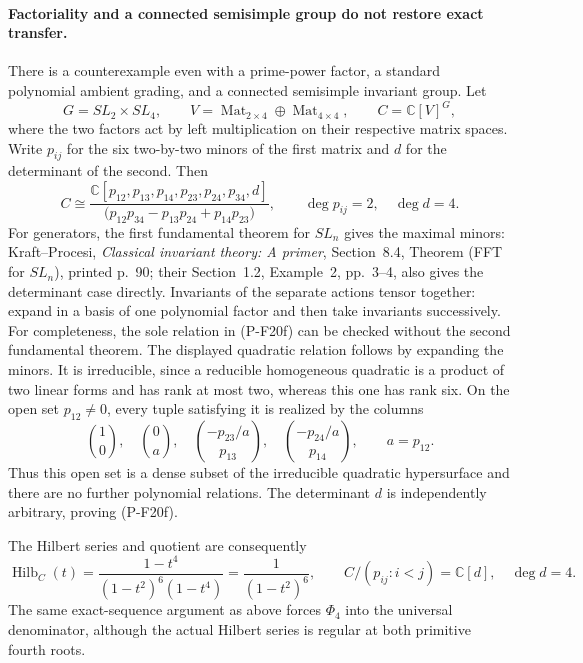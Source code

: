 \paragraph{Factoriality and a connected semisimple group do not restore exact transfer.}
There is a counterexample even with a prime-power factor, a standard
polynomial ambient grading, and a connected semisimple invariant group.
Let
\[
 G=SL_2\times SL_4,\qquad
 V=\operatorname{Mat}_{2\times4}\oplus
       \operatorname{Mat}_{4\times4},\qquad
 C=\mathbb C[V]^G,
\]
where the two factors act by left multiplication on their respective
matrix spaces. Write $p_{ij}$ for the six two-by-two minors of the
first matrix and $d$ for the determinant of the second. Then
\[
 C\cong
 \frac{\mathbb C[p_{12},p_{13},p_{14},p_{23},p_{24},p_{34},d]}
 {\bigl(p_{12}p_{34}-p_{13}p_{24}+p_{14}p_{23}\bigr)},
 \qquad \deg p_{ij}=2,\quad\deg d=4.
 \tag{P-F20f}
\]
For generators, the first fundamental theorem for $SL_n$ gives the
maximal minors: Kraft--Procesi, \emph{Classical invariant theory:
A primer}, Section~8.4, Theorem (FFT for $SL_n$), printed p.~90;
their Section~1.2, Example~2, pp.~3--4, also gives the determinant
case directly. Invariants of the separate actions tensor together:
expand in a basis of one polynomial factor and then take invariants
successively. For completeness, the sole relation in (P-F20f) can
be checked without the second fundamental theorem. The displayed
quadratic relation follows by expanding the minors. It is irreducible,
since a reducible homogeneous quadratic is a product of two linear
forms and has rank at most two, whereas this one has rank six. On
the open set $p_{12}\ne0$, every tuple satisfying it is realized
by the columns
\[
 \binom10,\quad \binom0a,\quad
 \binom{-p_{23}/a}{p_{13}},\quad
 \binom{-p_{24}/a}{p_{14}},\qquad a=p_{12}.
\]
Thus this open set is a dense subset of the irreducible quadratic
hypersurface and there are no further polynomial relations. The
determinant $d$ is independently arbitrary, proving (P-F20f).

The Hilbert series and quotient are consequently
\[
 \operatorname{Hilb}_C(t)
   =\frac{1-t^4}{(1-t^2)^6(1-t^4)}
   =\frac1{(1-t^2)^6},\qquad
 C/(p_{ij}:i<j)=\mathbb C[d],\quad\deg d=4.
 \tag{P-F20g}
\]
The same exact-sequence argument as above forces $\Phi_4$ into
the universal denominator, although the actual Hilbert series is
regular at both primitive fourth roots.

